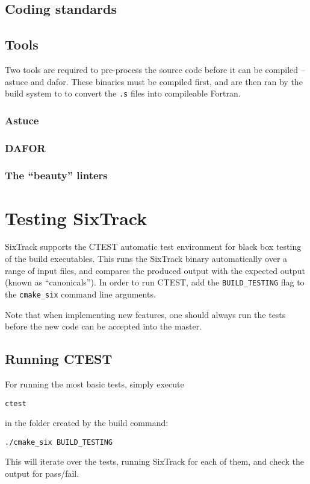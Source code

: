 \documentclass[english,BCOR=0mm,DIV=18]{scrartcl}
\begin{document}
\subsection{Coding standards}

\subsection{Tools}

Two tools are required to pre-process the source code before it can be compiled -- astuce and dafor.
These binaries must be compiled first, and are then ran by the build system to to convert the \texttt{.s} files into compileable Fortran.

\subsubsection{Astuce}

\subsubsection{DAFOR}

\subsubsection{The ``beauty'' linters}


\section{Testing SixTrack}
\label{sec:testing}
SixTrack supports the CTEST automatic test environment for black box testing of the build executables.
This runs the SixTrack binary automatically over a range of input files, and compares the produced output with the expected output (known as ``canonicals'').
In order to run CTEST, add the \texttt{BUILD\_TESTING} flag to the \texttt{cmake\_six} command line arguments.

Note that when implementing new features, one should always run the tests before the new code can be accepted into the master.

\subsection{Running CTEST}
For running the most basic tests, simply execute
\begin{lstlisting}
ctest
\end{lstlisting}
in the folder created by the build command:
\begin{lstlisting}
./cmake_six BUILD_TESTING
\end{lstlisting}
This will iterate over the tests, running SixTrack for each of them, and check the output for pass/fail.
\end{document}
